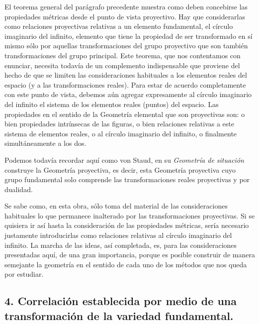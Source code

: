\documentclass[a4paper, 12pt]{article}
\begin{document}
El teorema general del parágrafo precedente muestra como deben concebirse las propiedades métricas desde el punto de vista proyectivo. Hay que considerarlas como relaciones proyectivas relativas a un elemento fundamental, el círculo imaginario del infinito, elemento que tiene la propiedad de ser transformado en sí mismo sólo por aquellas transformaciones del grupo proyectivo que son también transformaciones del grupo principal. Este teorema, que nos contentamos con enunciar, necesita todavía de un complemento indispensable que proviene del hecho de que se limiten las consideraciones habituales a los elementos reales del espacio (y a las transformaciones reales). Para estar de acuerdo completamente con este punto de vista, debemos aún agregar expresamente al círculo imaginario del infinito el sistema de los elementos reales (puntos) del espacio. Las propiedades en el sentido de la Geometría elemental que son proyectivas son: o bien propiedades intrínsecas de las figuras, o bien relaciones relativas a este sistema de elementos reales, o al círculo imaginario del infinito, o finalmente simultáneamente a los dos.

Podemos todavía recordar aquí como von Staud, en su \textit{Geometría de situación} construye la Geometría proyectiva, es decir, esta Geometría proyectiva cuyo grupo fundamental solo comprende las transformaciones reales proyectivas y por dualidad.

Se sabe como, en esta obra, sólo toma del material de las consideraciones habituales lo que permanece inalterado por las transformaciones proyectivas. Si se quisiera ir así hasta la consideración de las propiedades métricas, sería necesario justamente introducirlas como relaciones relativas al círculo imaginario del infinito. La marcha de las ideas, así completada, es, para las consideraciones presentadas aquí, de una gran importancia, porque es posible construir de manera semejante la geometría en el sentido de cada uno de los métodos que nos queda por estudiar. 

 \subsection*{4. Correlación establecida por medio de una transformación de la variedad fundamental.}
\end{document}
